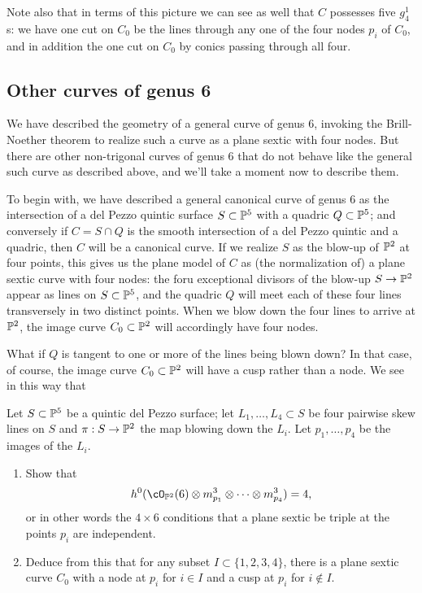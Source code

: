 Note also that in terms of this picture we can see as well that $C$ possesses five $g^1_4$s: we have one cut on $C_0$ be the lines through any one of the four nodes $p_i$ of $C_0$, and in addition the one cut on $C_0$ by conics passing through all four.

\subsection{Other curves of genus 6}

We have described the geometry of a general curve of genus 6, invoking the Brill-Noether theorem to realize such a curve as a plane sextic with four nodes. But there are other non-trigonal curves of genus 6 that do not behave like the general such curve as described above, and we'll take a moment now to describe them.

To begin with, we have described a general canonical curve of genus 6 as the intersection of a del Pezzo quintic surface $S \subset \PP^5$ with a quadric $Q \subset \PP^5$; and conversely if $C = S \cap Q$ is the smooth intersection of a del Pezzo quintic and a quadric, then $C$ will be a canonical curve. If we realize $S$ as the blow-up of $\PP^2$ at four points, this gives us the plane model of $C$ as (the normalization of) a plane sextic curve with four nodes: the foru exceptional divisors of the blow-up $S \to \PP^2$ appear as lines on $S \subset \PP^5$, and the quadric $Q$ will meet each of these four lines transversely in two distinct points. When we blow down the four lines to arrive at $\PP^2$, the image curve $C_0 \subset \PP^2$ will accordingly have four nodes.

What if $Q$ is tangent to one or more of the lines being blown down? In that case, of course, the image curve $C_0 \subset \PP^2$ will have a cusp rather than a node. We see in this way that 

\begin{exercise}
Let $S \subset \PP^5$ be a quintic del Pezzo surface; let $L_1,\dots,L_4 \subset S$ be four pairwise skew lines on $S$ and $\pi : S \to \PP^2$ the map blowing down the $L_i$. Let $p_1,\dots,p_4 $ be the images of the $L_i$.
\begin{enumerate}
\item Show that 
$$
h^0(\cO_{\PP^2}(6) \otimes m_{p_1}^3 \otimes \dots \otimes m_{p_4}^3) = 4,
$$
or in other words the $4 \times 6$ conditions that a plane sextic be triple at the points $p_i$ are independent.
\item Deduce from this that for any subset $I \subset \{1,2,3,4\}$, there is a plane sextic curve $C_0$ with a node at $p_i$ for $i \in I$ and a cusp at $p_i$ for $i \notin I$.
\end{enumerate}
\end{exercise}

